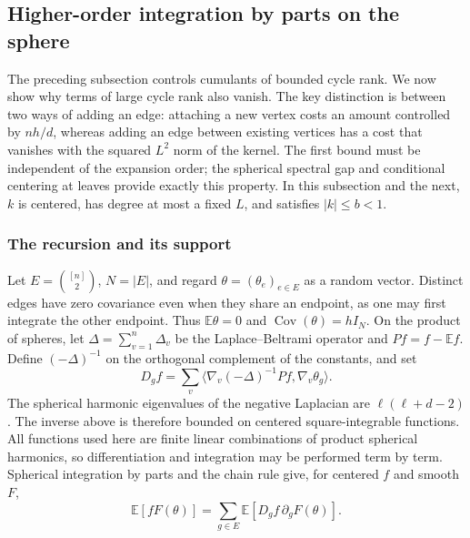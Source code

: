 \documentclass[11pt,reqno]{amsart}
\numberwithin{equation}{section}
\theoremstyle{definition}
\theoremstyle{remark}
\theoremstyle{definition}
\begin{document}
\subsection{Higher-order integration by parts on the sphere}\label{sec:stein}
The preceding subsection controls cumulants of bounded cycle rank. We now show why terms of large cycle rank also vanish.
The key distinction is between two ways of adding an edge: attaching a new vertex costs an amount controlled by $nh/d$,
whereas adding an edge between existing vertices has a cost that vanishes with the squared $L^2$ norm of the kernel.
The first bound must be independent of the expansion order; the spherical spectral gap and conditional centering at leaves provide exactly this property.
In this subsection and the next, $k$ is centered, has degree at most a fixed $L$, and satisfies $|k|\le b<1$.

\subsubsection{The recursion and its support}
Let $E=\binom{[n]}2$, $N=|E|$, and regard $\theta=(\theta_e)_{e\in E}$ as a random vector.
Distinct edges have zero covariance even when they share an endpoint, as one may first integrate the other endpoint.
Thus $\mathbb E\theta=0$ and $\operatorname{Cov}(\theta)=hI_N$.
On the product of spheres, let $\Delta=\sum_{v=1}^n\Delta_v$ be the Laplace--Beltrami operator and
$Pf=f-\mathbb Ef$. Define $(-\Delta)^{-1}$ on the orthogonal complement of the constants, and set
\[
 D_g f=\sum_v\langle\nabla_v(-\Delta)^{-1}Pf,\nabla_v\theta_g\rangle.
\]
The spherical harmonic eigenvalues of the negative Laplacian are $\ell(\ell+d-2)$ \cite[Section 1.4]{DaiXu}.
The inverse above is therefore bounded on centered square-integrable functions.
All functions used here are finite linear combinations of product spherical harmonics, so differentiation and integration may be performed term by term.
Spherical integration by parts and the chain rule give, for centered $f$ and smooth $F$,
\begin{equation}\label{eq:stein-identity}
 \mathbb E[fF(\theta)]=\sum_{g\in E}\mathbb E[D_gf\,\partial_gF(\theta)].
\end{equation}
\end{document}
